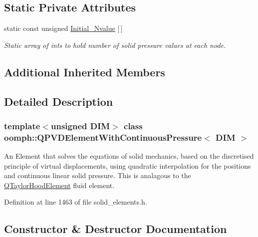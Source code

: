 \subsection*{Static Private Attributes}
\begin{DoxyCompactItemize}
\item 
static const unsigned \hyperlink{classoomph_1_1QPVDElementWithContinuousPressure_a5681dd388f66361939e18e5c8e7df0a2}{Initial\+\_\+\+Nvalue} \mbox{[}$\,$\mbox{]}
\begin{DoxyCompactList}\small\item\em Static array of ints to hold number of solid pressure values at each node. \end{DoxyCompactList}\end{DoxyCompactItemize}
\subsection*{Additional Inherited Members}


\subsection{Detailed Description}
\subsubsection*{template$<$unsigned D\+IM$>$\newline
class oomph\+::\+Q\+P\+V\+D\+Element\+With\+Continuous\+Pressure$<$ D\+I\+M $>$}

An Element that solves the equations of solid mechanics, based on the discretised principle of virtual displacements, using quadratic interpolation for the positions and continuous linear solid pressure. This is analagous to the \hyperlink{classoomph_1_1QTaylorHoodElement}{Q\+Taylor\+Hood\+Element} fluid element. 

Definition at line 1463 of file solid\+\_\+elements.\+h.



\subsection{Constructor \& Destructor Documentation}
\mbox{\label{classoomph_1_1QPVDElementWithContinuousPressure_a11129d7ef7c335ccf25b06a42b6991ca}} 

